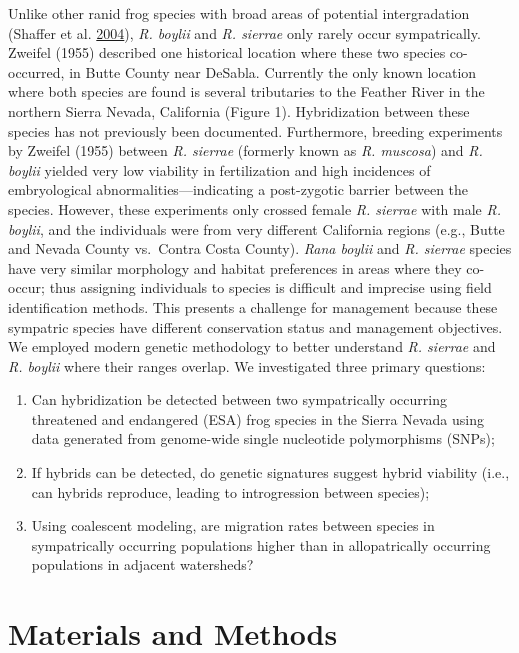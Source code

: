 \documentclass[proquest,12pt,final]{ucthesis-CA2012} %
\providecommand{\tightlist}{%
  \setlength{\itemsep}{0pt}\setlength{\parskip}{0pt}}
\begin{document}
\begin{ucmainmatter}
Unlike other ranid frog species with broad areas of potential
intergradation (Shaffer et al.
\protect\hyperlink{ref-shaffer_species_2004}{2004}), \emph{R. boylii}
and \emph{R. sierrae} only rarely occur sympatrically. Zweifel (1955)
described one historical location where these two species co-occurred,
in Butte County near DeSabla. Currently the only known location where
both species are found is several tributaries to the Feather River in
the northern Sierra Nevada, California (Figure 1). Hybridization between
these species has not previously been documented. Furthermore, breeding
experiments by Zweifel (1955) between \emph{R. sierrae} (formerly known
as \emph{R. muscosa}) and \emph{R. boylii} yielded very low viability in
fertilization and high incidences of embryological
abnormalities---indicating a post-zygotic barrier between the species.
However, these experiments only crossed female \emph{R. sierrae} with
male \emph{R. boylii}, and the individuals were from very different
California regions (e.g., Butte and Nevada County vs.~Contra Costa
County). \emph{Rana boylii} and \emph{R. sierrae} species have very
similar morphology and habitat preferences in areas where they co-occur;
thus assigning individuals to species is difficult and imprecise using
field identification methods. This presents a challenge for management
because these sympatric species have different conservation status and
management objectives. We employed modern genetic methodology to better
understand \emph{R. sierrae} and \emph{R. boylii} where their ranges
overlap. We investigated three primary questions:
\begin{enumerate}
\def\labelenumi{\arabic{enumi}.}
\tightlist
\item
  Can hybridization be detected between two sympatrically occurring
  threatened and endangered (ESA) frog species in the Sierra Nevada
  using data generated from genome-wide single nucleotide polymorphisms
  (SNPs);
\item
  If hybrids can be detected, do genetic signatures suggest hybrid
  viability (i.e., can hybrids reproduce, leading to introgression
  between species);
\item
  Using coalescent modeling, are migration rates between species in
  sympatrically occurring populations higher than in allopatrically
  occurring populations in adjacent watersheds?
\end{enumerate}
\hypertarget{materials-and-methods}{%
\section{Materials and Methods}\label{materials-and-methods}}


\end{ucmainmatter}
\end{document}
